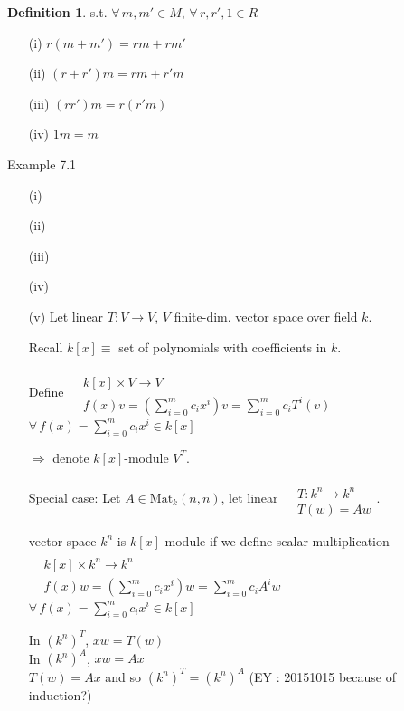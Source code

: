 \documentclass[twoside,landscape]{amsart}
\theoremstyle{plain}
\theoremstyle{definition}
\newtheorem{definition}{Definition}
\theoremstyle{remark}
\begin{document}
\begin{multicols*}{2}
\begin{definition}
s.t. $\forall \, m,m' \in M$, $\forall \, r,r',1 \in R$
\begin{enumerate}
  \item[(i)] $r(m+m')=rm+rm'$
  \item[(ii)] $(r+r')m = rm+r'm$
  \item[(iii)] $(rr')m = r(r'm)$
  \item[(iv)] $1m = m$
\end{enumerate}
\end{definition}

Example 7.1 \begin{enumerate}
\item[(i)]
\item[(ii)]
\item[(iii)]
\item[(iv)]
\item[(v)] Let linear $T:V \to V$, $V$ finite-dim. vector space over field $k$.  

Recall $k[x] \equiv $ set of polynomials with coefficients in $k$.  

Define $\begin{aligned} & \quad \\
  & k[x] \times V \to V \\
  & f(x)v =\left(\sum_{i=0}^m c_i x^i\right)v =\sum_{i=0}^m c_iT^i(v) \end{aligned}$ \quad \, $\forall \, f(x) = \sum_{i=0}^m c_ix^i \in k[x]$

$\Longrightarrow $ denote $k[x]$-module $V^T$.  

Special case: Let $A \in \text{Mat}_k(n,n)$, let linear $\begin{aligned} & \quad \\
  & T :k^n \to k^n \\
  & T(w) = Aw \end{aligned}$.  

vector space $k^n$ is $k[x]$-module if we define scalar multiplication $\begin{aligned} & \quad \\
  & k[x] \times k^n \to k^n \\
  & f(x)w = \left( \sum_{i=0}^m c_ix^i \right)w = \sum_{i=0}^m c_i A^i w \end{aligned}$ \quad \, $\forall \, f(x) = \sum_{i=0}^m c_ix^i \in k[x]$

In $(k^n)^T$, $xw = T(w)$ \\
In $(k^n)^A$, $xw = Ax $ \\
$T(w) = Ax$ and so $(k^n)^T = (k^n)^A$  (EY : 20151015 because of induction?)
\end{enumerate}


\end{multicols*}
\end{document}
